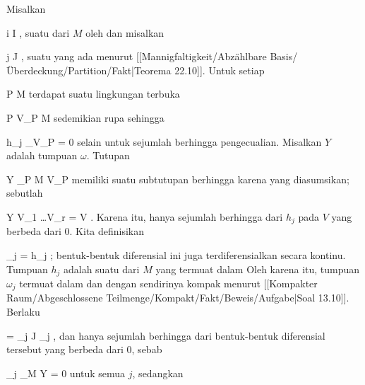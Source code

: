 {

\teilbeweis {}{}{}
{Misalkan

 {}
 {i \in I} {}
 {} {} {} {,}
suatu
dari $M$ oleh
dan misalkan

 {}
 {j \in J} {}
 {} {} {} {,}
suatu
yang ada menurut
[[Mannigfaltigkeit/Abzählbare Basis/Überdeckung/Partition/Fakt|Teorema 22.10]].
Untuk setiap

\mavergleichskette
{\vergleichskette
{ P
}
{ \in }{ M
}
{  }{
}
{    }{
}
{   }{
}
}
{}{}{}
terdapat suatu lingkungan terbuka

\mavergleichskette
{\vergleichskette
{ P
}
{ \in }{ V_P
}
{ \subseteq }{ M
}
{    }{
}
{   }{
}
}
{}{}{}
sedemikian rupa sehingga

\mavergleichskette
{\vergleichskette
{ h_j \vert_{V_P }
}
{ = }{ 0
}
{  }{
}
{    }{
}
{   }{
}
}
{}{}{}
selain untuk sejumlah berhingga pengecualian. Misalkan $Y$ adalah tumpuan $\omega$. Tutupan

\mavergleichskette
{\vergleichskette
{ Y
}
{ \subseteq }{ \bigcup_{P \in M} V_P
}
{  }{
}
{    }{
}
{   }{
}
}
{}{}{}
memiliki suatu subtutupan berhingga karena
yang diasumsikan; sebutlah

\mavergleichskettedisp
{\vergleichskette
{ Y
}
{ \subseteq} { V_{1} \cup \ldots \cup V_{r}
}
{ =} { V
}
{ } {
}
{ } {
}
}
{}{}{.}
Karena itu, hanya sejumlah berhingga dari $h_j$ pada $V$ yang berbeda dari $0$. Kita definisikan

\mavergleichskette
{\vergleichskette
{ \omega_j
}
{ = }{ h_j \omega
}
{  }{
}
{    }{
}
{   }{
}
}
{}{}{;}
bentuk-bentuk diferensial ini juga terdiferensialkan secara kontinu. Tumpuan $h_j$ adalah suatu
dari $M$ yang termuat dalam
 Oleh karena itu, tumpuan $\omega_j$ termuat dalam
 dan dengan sendirinya kompak menurut
[[Kompakter Raum/Abgeschlossene Teilmenge/Kompakt/Fakt/Beweis/Aufgabe|Soal 13.10]].
Berlaku

\mavergleichskettedisp
{\vergleichskette
{ \omega
}
{ =} { \sum_{j \in J} \omega_j
}
{ } {
}
{ } {
}
{ } {
}
}
{}{}{,}
dan hanya sejumlah berhingga dari bentuk-bentuk diferensial
 tersebut yang berbeda dari $0$, sebab

\mavergleichskette
{\vergleichskette
{ \omega_j \vert_{M \setminus Y}
}
{ = }{ 0
}
{  }{
}
{    }{
}
{   }{
}
}
{}{}{}
untuk semua $j$, sedangkan

}}
